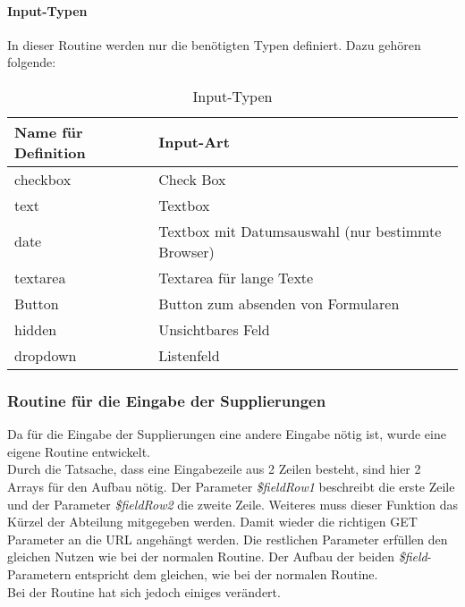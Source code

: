 \paragraph{Input-Typen} \label{sec:content_imple_input_type}
In dieser Routine werden nur die benötigten Typen definiert. Dazu gehören folgende:
\begin{table}[H]
\centering
\begin{tabular}{p{5 cm}p{10 cm}}
   \toprule
   \textbf{Name für Definition} & \textbf{Input-Art} \\
   \midrule
          checkbox & Check Box  \\
          \hline
          text & Textbox \\
          \hline
          date & Textbox mit Datumsauswahl (nur bestimmte Browser) \\
          \hline
          textarea & Textarea für lange Texte\\
          \hline
          Button & Button zum absenden von Formularen\\
          \hline
          hidden & Unsichtbares Feld \\
          \hline
          dropdown & Listenfeld \\
   \bottomrule
\end{tabular}
\caption{Input-Typen}
\end{table}
\subsubsection{Routine für die Eingabe der Supplierungen}
Da für die Eingabe der Supplierungen eine andere Eingabe nötig ist, wurde eine eigene Routine entwickelt.\\
Durch die Tatsache, dass eine Eingabezeile aus 2 Zeilen besteht, sind hier 2 Arrays für den Aufbau nötig. Der Parameter \textit{\$fieldRow1} beschreibt die erste Zeile und der Parameter \textit{\$fieldRow2} die zweite Zeile. Weiteres muss dieser Funktion das Kürzel der Abteilung mitgegeben werden. Damit wieder die richtigen GET Parameter an die URL angehängt werden. Die restlichen Parameter erfüllen den gleichen Nutzen wie bei der normalen Routine. Der Aufbau der beiden \textit{\$field}-Parametern entspricht dem gleichen, wie bei der normalen Routine.\\
Bei der Routine hat sich jedoch einiges verändert.
